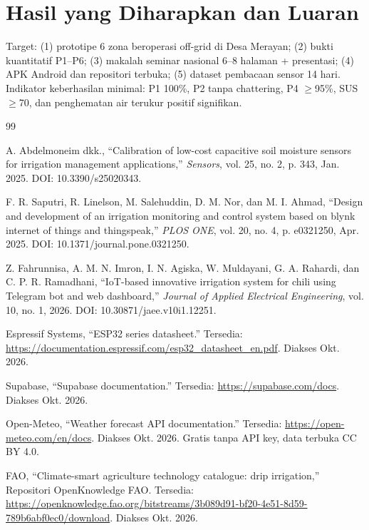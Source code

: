 \documentclass[12pt,a4paper,oneside]{report}
\begin{document}
\chapter{Hasil yang Diharapkan dan Luaran}

Target: (1) prototipe 6 zona beroperasi off-grid di Desa Merayan; (2) bukti kuantitatif P1--P6; (3) makalah seminar nasional 6--8 halaman + presentasi; (4) APK Android dan repositori terbuka; (5) dataset pembacaan sensor 14 hari. Indikator keberhasilan minimal: P1 100\%, P2 tanpa chattering, P4 $\geq$95\%, SUS $\geq$70, dan penghematan air terukur positif signifikan.

\begin{thebibliography}{99}

 A. Abdelmoneim dkk., ``Calibration of low-cost capacitive soil moisture sensors for irrigation management applications,'' \textit{Sensors}, vol. 25, no. 2, p. 343, Jan. 2025. DOI: 10.3390/s25020343.

 F. R. Saputri, R. Linelson, M. Salehuddin, D. M. Nor, dan M. I. Ahmad, ``Design and development of an irrigation monitoring and control system based on blynk internet of things and thingspeak,'' \textit{PLOS ONE}, vol. 20, no. 4, p. e0321250, Apr. 2025. DOI: 10.1371/journal.pone.0321250.

 Z. Fahrunnisa, A. M. N. Imron, I. N. Agiska, W. Muldayani, G. A. Rahardi, dan C. P. R. Ramadhani, ``IoT-based innovative irrigation system for chili using Telegram bot and web dashboard,'' \textit{Journal of Applied Electrical Engineering}, vol. 10, no. 1, 2026. DOI: 10.30871/jaee.v10i1.12251.

 Espressif Systems, ``ESP32 series datasheet.'' Tersedia: \url{https://documentation.espressif.com/esp32_datasheet_en.pdf}. Diakses Okt. 2026.

 Supabase, ``Supabase documentation.'' Tersedia: \url{https://supabase.com/docs}. Diakses Okt. 2026.

 Open-Meteo, ``Weather forecast API documentation.'' Tersedia: \url{https://open-meteo.com/en/docs}. Diakses Okt. 2026. Gratis tanpa API key, data terbuka CC BY 4.0.

 FAO, ``Climate-smart agriculture technology catalogue: drip irrigation,'' Repositori OpenKnowledge FAO. Tersedia: \url{https://openknowledge.fao.org/bitstreams/3b089d91-bf20-4e51-8d59-789b6abf0ec0/download}. Diakses Okt. 2026.

\end{thebibliography}
\end{document}
